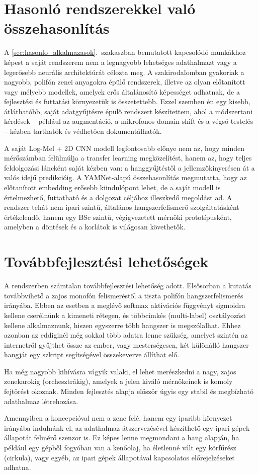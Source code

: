 \section{Hasonló rendszerekkel való összehasonlítás}
A \ref{sec:hasonlo_alkalmazasok}.~szakaszban bemutatott kapcsolódó munkákhoz képest a saját rendszerem nem a legnagyobb lehetséges adathalmazt vagy a legerősebb neurális architektúrát célozta meg. A szakirodalomban gyakoriak a nagyobb, polifón zenei anyagokra épülő rendszerek, illetve az olyan előtanított vagy mélyebb modellek, amelyek erős általánosító képességet adhatnak, de a fejlesztési és futtatási környezetük is összetettebb. Ezzel szemben én egy kisebb, átláthatóbb, saját adatgyűjtésre épülő rendszert készítettem, ahol a módszertani kérdések -- például az augmentáció, a mikrofonos domain shift és a végső testelés -- kézben tarthatók és védhetően dokumentálhatók.

A saját Log-Mel + 2D CNN modell legfontosabb előnye nem az, hogy minden mérőszámban felülmúlja a transfer learning megközelítést, hanem az, hogy teljes feldolgozási láncként saját kézben van: a hanggyűjtéstől a jellemzőkinyerésen át a valós idejű predikcióig. A YAMNet-alapú összehasonlítás megmutatta, hogy az előtanított embedding erősebb kiindulópont lehet, de a saját modell is értelmezhető, futtatható és a dolgozat céljához illeszkedő megoldást ad. A rendszer tehát nem ipari szintű, általános hangszerfelismerő szolgáltatásként értékelendő, hanem egy BSc szintű, végigvezetett mérnöki prototípusként, amelyben a döntések és a korlátok is világosan követhetők.

\section{Továbbfejlesztési lehetőségek}
A rendszerben számtalan továbbfejlesztési lehetőség adott. Elsősorban a kutatás továbbvihető a zajos monofón felismeréstől a tiszta polifón hangszerfelismerés irányába. Ebben az esetben a meglévő softmax aktivációs függvényt sigmoidra kellene cserélnünk a kimeneti rétegen, és többcímkés (multi-label) osztályozást kellene alkalmaznunk, hiszen egyszerre több hangszer is megszólalhat. Ehhez azonban az eddiginél még sokkal több adatra lenne szükség, amelyet szintén az internetről gyűjthet össze az ember, vagy mesterségesen, két különálló hangszer hangját egy szkript segítségével összekeverve állíthat elő.

Ha még nagyobb kihívásra vágyik valaki, el lehet merészkedni a nagy, zajos zenekarokig (orchesztrákig), amelyek a jelen kiváló mérnökeinek is komoly fejtörést okoznak. Minden fejlesztés alapja először úgyis egy stabil és megbízható adathalmaz létrehozása.

Amennyiben a koncepcióval nem a zene felé, hanem egy iparibb környezet irányába indulnánk el, az adathalmaz átszervezésével készíthető egy ipari gépek állapotát felmérő szenzor is. Ez képes lenne megmondani a hang alapján, ha például egy gépből fogyóban van a kenőolaj, ha életlenné vált egy körfűrész (cirkula), vagy egyéb, az ipari gépek állapotával kapcsolatos előrejelzéseket adhatna.
